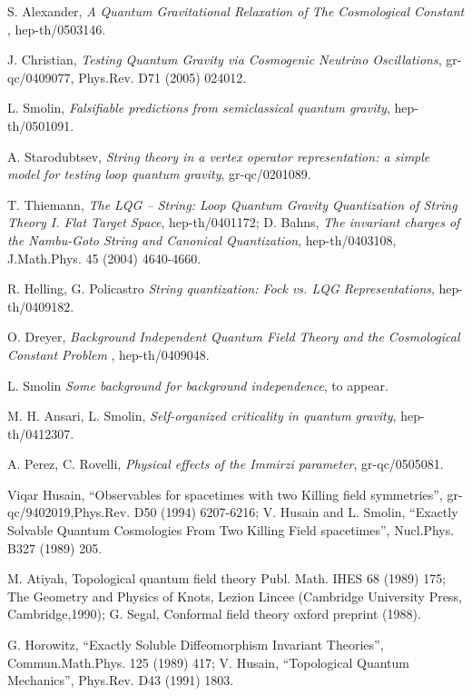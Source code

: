\documentclass[12pt]{article}
\begin{document}
\begin{thebibliography}{0}
{{{S. Alexander, {
\it  A Quantum Gravitational Relaxation of The Cosmological Constant  }, 
hep-th/0503146. 



J.  Christian, {\it 
Testing Quantum Gravity via Cosmogenic Neutrino Oscillations}, 
gr-qc/0409077,  Phys.Rev. D71 (2005) 024012. 

L. Smolin, {\it Falsifiable predictions from
semiclassical quantum gravity}, 
hep-th/0501091. 

A.  Starodubtsev,
{\it String theory in a vertex operator representation: a simple model for testing loop quantum gravity},  gr-qc/0201089.   

T. Thiemann, 
{\it The LQG -- String: Loop Quantum Gravity Quantization of String Theory I. Flat Target Space},  hep-th/0401172; D. Bahns, {\it 
The invariant charges of the Nambu-Goto String and Canonical Quantization}, 
hep-th/0403108,  J.Math.Phys. 45 (2004) 4640-4660. 

R. Helling, G. Policastro
{\it   String quantization: Fock vs. LQG Representations}, 
hep-th/0409182.  

O. Dreyer, {\it Background Independent Quantum Field Theory and the Cosmological Constant Problem  }, hep-th/0409048.  

L. Smolin {\it Some background for
background independence}, to appear. 

M. H. Ansari, L.  Smolin,
{\it Self-organized criticality in quantum gravity},
hep-th/0412307. 

A. Perez, C.  Rovelli, {\it Physical effects of the Immirzi parameter},
gr-qc/0505081. 

Viqar Husain, ``Observables for spacetimes with two Killing
field symmetries'', gr-qc/9402019,Phys.Rev. D50 (1994) 6207-6216;
V. Husain and L. Smolin, ``Exactly Solvable Quantum Cosmologies From
Two Killing Field spacetimes'', Nucl.Phys. B327 (1989) 205.

M. Atiyah, Topological quantum field theory Publ. Math. IHES 68
(1989) 175; The Geometry and Physics of Knots, Lezion Lincee (Cambridge
University Press, Cambridge,1990); G. Segal, Conformal field
theory oxford preprint (1988).

G. Horowitz,  ``Exactly Soluble Diffeomorphism Invariant
Theories'', Commun.Math.Phys. 125 (1989) 417; V. Husain, ``Topological
Quantum Mechanics'',  Phys.Rev. D43 (1991) 1803.

}}}
\end{thebibliography}
\end{document}

